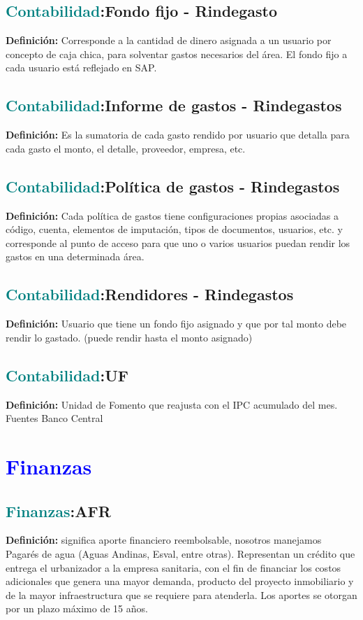 \documentclass[12pt]{article}
\begin{document}
\subsection{\textcolor{teal}{Contabilidad}:{Fondo fijo - Rindegasto}}
\textbf{Definición:} Corresponde a la cantidad de dinero asignada a un usuario por concepto de caja chica, para solventar gastos necesarios del área. El fondo fijo a cada usuario está reflejado en SAP.
\subsection{\textcolor{teal}{Contabilidad}:{Informe de gastos - Rindegastos}}
\textbf{Definición:} Es la sumatoria de cada gasto rendido por usuario que detalla para cada gasto el monto, el detalle, proveedor, empresa, etc.
\subsection{\textcolor{teal}{Contabilidad}:{Política de gastos - Rindegastos}}
\textbf{Definición:} Cada política de gastos tiene configuraciones propias asociadas a código, cuenta, elementos de imputación, tipos de documentos, usuarios, etc. y corresponde al punto de acceso para que uno o varios usuarios puedan rendir los gastos en una determinada área.
\subsection{\textcolor{teal}{Contabilidad}:{Rendidores - Rindegastos}}
\textbf{Definición:} Usuario que tiene un fondo fijo asignado y que por tal monto debe rendir lo gastado. (puede rendir hasta el monto asignado)
\subsection{\textcolor{teal}{Contabilidad}:{UF}}
\textbf{Definición:} Unidad de Fomento que reajusta con el IPC acumulado del mes. Fuentes Banco Central
\section{\textcolor{blue}{Finanzas}}
\subsection{\textcolor{teal}{Finanzas}:{AFR}}
\textbf{Definición:} significa aporte financiero reembolsable, nosotros manejamos Pagarés de agua (Aguas Andinas, Esval, entre otras). Representan un crédito que entrega el urbanizador a la empresa sanitaria, con el fin de financiar los costos adicionales que genera una mayor demanda, producto del proyecto inmobiliario y de la mayor infraestructura que se requiere para atenderla. Los aportes se otorgan por un plazo máximo de 15 años.
\end{document}
